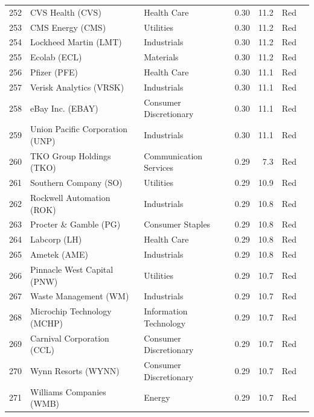 \documentclass[11pt,a4paper]{article}
\begin{document}
{\begin{longtable}{r p{4.4cm} p{2.8cm} r r l l}
252 & CVS Health (CVS) & Health Care & 0.30 & 11.2 & \cellcolor[HTML]{F4B6B6}Red &  \\
253 & CMS Energy (CMS) & Utilities & 0.30 & 11.2 & \cellcolor[HTML]{F4B6B6}Red &  \\
254 & Lockheed Martin (LMT) & Industrials & 0.30 & 11.2 & \cellcolor[HTML]{F4B6B6}Red &  \\
255 & Ecolab (ECL) & Materials & 0.30 & 11.2 & \cellcolor[HTML]{F4B6B6}Red &  \\
256 & Pfizer (PFE) & Health Care & 0.30 & 11.1 & \cellcolor[HTML]{F4B6B6}Red &  \\
257 & Verisk Analytics (VRSK) & Industrials & 0.30 & 11.1 & \cellcolor[HTML]{F4B6B6}Red &  \\
258 & eBay Inc. (EBAY) & Consumer Discretionary & 0.30 & 11.1 & \cellcolor[HTML]{F4B6B6}Red &  \\
259 & Union Pacific Corporation (UNP) & Industrials & 0.30 & 11.1 & \cellcolor[HTML]{F4B6B6}Red &  \\
260 & TKO Group Holdings (TKO) & Communication Services & 0.29 & 7.3 & \cellcolor[HTML]{F4B6B6}Red &  \\
261 & Southern Company (SO) & Utilities & 0.29 & 10.9 & \cellcolor[HTML]{F4B6B6}Red &  \\
262 & Rockwell Automation (ROK) & Industrials & 0.29 & 10.8 & \cellcolor[HTML]{F4B6B6}Red &  \\
263 & Procter \& Gamble (PG) & Consumer Staples & 0.29 & 10.8 & \cellcolor[HTML]{F4B6B6}Red &  \\
264 & Labcorp (LH) & Health Care & 0.29 & 10.8 & \cellcolor[HTML]{F4B6B6}Red &  \\
265 & Ametek (AME) & Industrials & 0.29 & 10.8 & \cellcolor[HTML]{F4B6B6}Red &  \\
266 & Pinnacle West Capital (PNW) & Utilities & 0.29 & 10.7 & \cellcolor[HTML]{F4B6B6}Red &  \\
267 & Waste Management (WM) & Industrials & 0.29 & 10.7 & \cellcolor[HTML]{F4B6B6}Red &  \\
268 & Microchip Technology (MCHP) & Information Technology & 0.29 & 10.7 & \cellcolor[HTML]{F4B6B6}Red &  \\
269 & Carnival Corporation (CCL) & Consumer Discretionary & 0.29 & 10.7 & \cellcolor[HTML]{F4B6B6}Red &  \\
270 & Wynn Resorts (WYNN) & Consumer Discretionary & 0.29 & 10.7 & \cellcolor[HTML]{F4B6B6}Red &  \\
271 & Williams Companies (WMB) & Energy & 0.29 & 10.7 & \cellcolor[HTML]{F4B6B6}Red &  \\

\end{longtable}}
\end{document}
